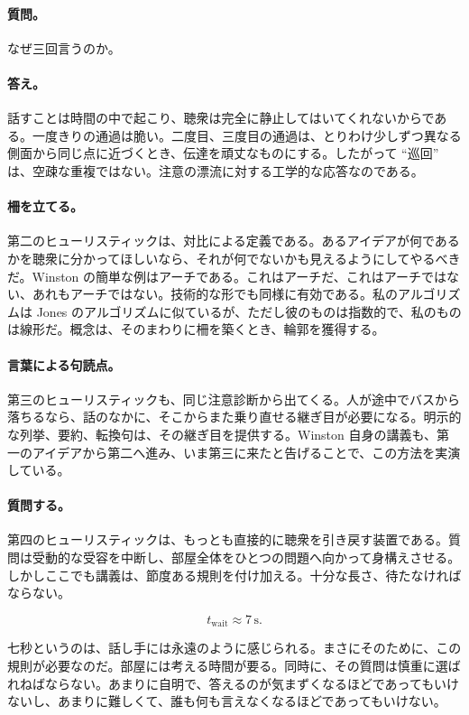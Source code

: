 \paragraph{質問。} なぜ三回言うのか。

\paragraph{答え。} 話すことは時間の中で起こり、聴衆は完全に静止してはいてくれないからである。一度きりの通過は脆い。二度目、三度目の通過は、とりわけ少しずつ異なる側面から同じ点に近づくとき、伝達を頑丈なものにする。したがって ``巡回'' は、空疎な重複ではない。注意の漂流に対する工学的な応答なのである。

\paragraph{柵を立てる。} 第二のヒューリスティックは、対比による定義である。あるアイデアが何であるかを聴衆に分かってほしいなら、それが何でないかも見えるようにしてやるべきだ。Winston の簡単な例はアーチである。これはアーチだ、これはアーチではない、あれもアーチではない。技術的な形でも同様に有効である。私のアルゴリズムは Jones のアルゴリズムに似ているが、ただし彼のものは指数的で、私のものは線形だ。概念は、そのまわりに柵を築くとき、輪郭を獲得する。

\paragraph{言葉による句読点。} 第三のヒューリスティックも、同じ注意診断から出てくる。人が途中でバスから落ちるなら、話のなかに、そこからまた乗り直せる継ぎ目が必要になる。明示的な列挙、要約、転換句は、その継ぎ目を提供する。Winston 自身の講義も、第一のアイデアから第二へ進み、いま第三に来たと告げることで、この方法を実演している。

\paragraph{質問する。} 第四のヒューリスティックは、もっとも直接的に聴衆を引き戻す装置である。質問は受動的な受容を中断し、部屋全体をひとつの問題へ向かって身構えさせる。しかしここでも講義は、節度ある規則を付け加える。十分な長さ、待たなければならない。

\begin{equation}
t_{\mathrm{wait}} \approx 7\,\mathrm{s}.
\end{equation}

七秒というのは、話し手には永遠のように感じられる。まさにそのために、この規則が必要なのだ。部屋には考える時間が要る。同時に、その質問は慎重に選ばれねばならない。あまりに自明で、答えるのが気まずくなるほどであってもいけないし、あまりに難しくて、誰も何も言えなくなるほどであってもいけない。

